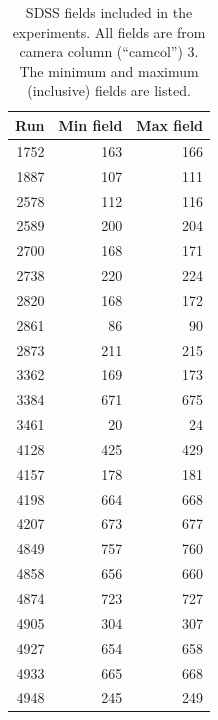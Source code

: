 \documentclass[letterpaper,preprint]{aastex}
\begin{document}
\begin{table}
\begin{center}
\begin{tabular}{|r|r|r|}
\hline
Run & Min field & Max field \\
\hline
1752 & 163 & 166 \\
1887 & 107 & 111 \\
2578 & 112 & 116 \\
2589 & 200 & 204 \\
2700 & 168 & 171 \\
2738 & 220 & 224 \\
2820 & 168 & 172 \\
2861 & 86 & 90 \\
2873 & 211 & 215 \\
3362 & 169 & 173 \\
3384 & 671 & 675 \\
3461 & 20 & 24 \\
4128 & 425 & 429 \\
4157 & 178 & 181 \\
4198 & 664 & 668 \\
4207 & 673 & 677 \\
4849 & 757 & 760 \\
4858 & 656 & 660 \\
4874 & 723 & 727 \\
4905 & 304 & 307 \\
4927 & 654 & 658 \\
4933 & 665 & 668 \\
4948 & 245 & 249 \\
\hline
\end{tabular}
\caption{SDSS fields included in the experiments.  All fields are from
  camera column (``camcol'') 3.  The minimum and maximum (inclusive)
  fields are listed.\label{tab:fields}}
\end{center}
\end{table}
\end{document}
